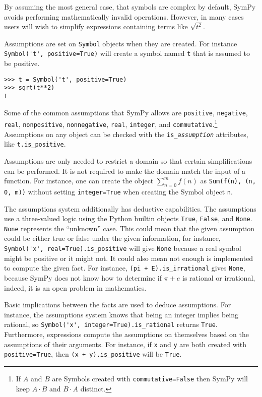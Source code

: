 By assuming the most general case, that symbols are complex by default, SymPy
avoids performing mathematically invalid operations. However, in many cases
users will wish to simplify expressions containing terms like $\sqrt{t^2}$.

Assumptions are set on \texttt{Symbol} objects when they are created. For
instance \verb|Symbol('t', positive=True)| will create a symbol named
\texttt{t} that is assumed to be positive.
\begin{verbatim}
>>> t = Symbol('t', positive=True)
>>> sqrt(t**2)
t
\end{verbatim}

Some of the common assumptions that SymPy allows are \texttt{positive},
\texttt{negative}, \texttt{real}, \texttt{nonpositive}, \texttt{nonnegative},
\texttt{real}, \texttt{integer}, and \texttt{commutative}.\footnote{If $A$ and
$B$ are Symbols created with \texttt{commutative=False} then SymPy will keep
$A\cdot B$ and $B\cdot A$ distinct.} Assumptions on any object can be checked with the
\verb|is_|\texttt{\textit{assumption}} attributes, like \verb|t.is_positive|.

Assumptions are only needed to restrict a domain so that certain
simplifications can be performed. It is not required to make the domain match
the input of a function. For instance, one can create the object
$\sum_{n=0}^m f(n)$ as \verb|Sum(f(n), (n, 0, m))| without setting
\texttt{integer=True} when creating the Symbol object \texttt{n}.

The assumptions system additionally has deductive capabilities. The
assumptions use a three-valued logic using the Python builtin objects
\texttt{True}, \texttt{False}, and \texttt{None}. \texttt{None} represents the
``unknown'' case. This could mean that the given assumption could be either
true or false under the given information, for instance,
\verb|Symbol('x', real=True).is_positive| will give \texttt{None} because a real
symbol might be positive or it might not. It could also mean not enough is
implemented to compute the given fact. For instance,
\verb|(pi + E).is_irrational| gives \texttt{None}, because SymPy does not know
how to determine if $\pi + e$ is rational or irrational, indeed, it is an open
problem in mathematics.


Basic implications between the facts are used to deduce assumptions. For
instance, the assumptions system knows that being an integer implies being
rational, so \verb|Symbol('x', integer=True).is_rational| returns
\texttt{True}. Furthermore, expressions compute the assumptions on themselves
based on the assumptions of their arguments. For instance, if \texttt{x} and
\texttt{y} are both created with \texttt{positive=True}, then
\verb|(x + y).is_positive| will be \texttt{True}.

